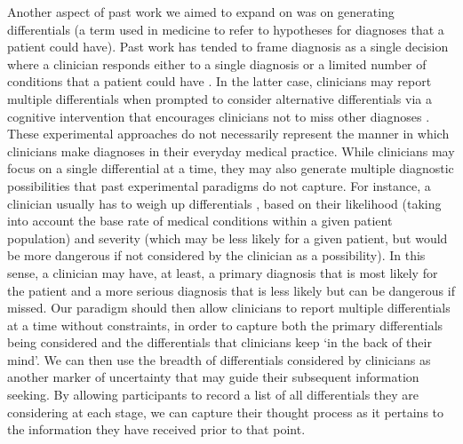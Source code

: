 \documentclass[a4paper, nobind]{templates/ociamthesis}
\begin{document}
\hfill\break
Another aspect of past work we aimed to expand on was on generating differentials (a term used in medicine to refer to hypotheses for diagnoses that a patient could have). Past work has tended to frame diagnosis as a single decision where a clinician responds either to a single diagnosis \autocite{redelmeier_fallacy_2023} or a limited number of conditions that a patient could have \autocite{meyer_physicians_2013}. In the latter case, clinicians may report multiple differentials when prompted to consider alternative differentials via a cognitive intervention that encourages clinicians not to miss other diagnoses \autocite{feyzi-behnagh_metacognitive_2014}. These experimental approaches do not necessarily represent the manner in which clinicians make diagnoses in their everyday medical practice. While clinicians may focus on a single differential at a time, they may also generate multiple diagnostic possibilities that past experimental paradigms do not capture. For instance, a clinician usually has to weigh up differentials \autocite{schiff_diagnostic_2009}, based on their likelihood (taking into account the base rate of medical conditions within a given patient population) and severity (which may be less likely for a given patient, but would be more dangerous if not considered by the clinician as a possibility). In this sense, a clinician may have, at least, a primary diagnosis that is most likely for the patient and a more serious diagnosis that is less likely but can be dangerous if missed. Our paradigm should then allow clinicians to report multiple differentials at a time without constraints, in order to capture both the primary differentials being considered and the differentials that clinicians keep `in the back of their mind'. We can then use the breadth of differentials considered by clinicians as another marker of uncertainty that may guide their subsequent information seeking. By allowing participants to record a list of all differentials they are considering at each stage, we can capture their thought process as it pertains to the information they have received prior to that point.
\end{document}
